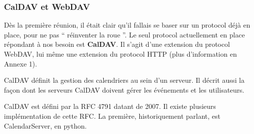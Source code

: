 \subsubsection*{CalDAV et WebDAV}

Dès la première réunion, il était clair qu'il fallais se baser sur un protocol déjà en place, pour ne pas `` réinventer la roue ''. Le seul protocol actuellement en place répondant à nos besoin est \textbf{CalDAV}. Il s'agit d'une extension du protocol WebDAV, lui même une extension du protocol HTTP (plus d'information en Annexe 1). 

CalDAV définit la gestion des calendriers au sein d'un serveur. Il décrit aussi la façon dont les serveurs CalDAV doivent gérer les événements et les utilisateurs.

CalDAV est défini par la RFC 4791 datant de 2007. Il existe plusieurs implémentation de cette RFC. La première, historiquement parlant, est CalendarServer, en python.

